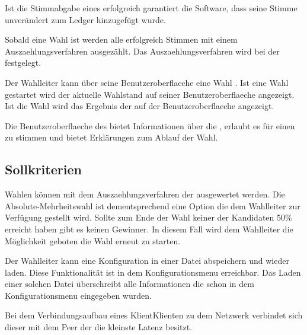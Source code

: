 \documentclass[parskip=full,11pt,twoside]{scrartcl}
\begin{document}
Ist die \gls{Stimmabgabe} eines  erfolgreich garantiert die Software, dass seine \gls{Stimme} unverändert zum \gls{Ledger} hinzugefügt wurde.

Sobald eine \gls{Wahl}  ist werden alle erfolgreich  Stimmen mit einem \gls{Auszaehlungsverfahren} ausgezählt. Das \gls{Auszaehlungsverfahren} wird bei der  festgelegt.

Der \gls{Wahlleiter} kann über seine \gls{Benutzeroberflaeche} eine Wahl . Ist eine \gls{Wahl} gestartet wird der aktuelle \gls{Wahlstand} auf seiner \gls{Benutzeroberflaeche} angezeigt. Ist die Wahl  wird das Ergebnis der  auf der \gls{Benutzeroberflaeche} angezeigt.

Die \gls{Benutzeroberflaeche} des  bietet Informationen über die , erlaubt es für einen  zu stimmen und bietet Erklärungen zum Ablauf der Wahl.

\subsection{Sollkriterien}

Wahlen können mit dem \gls{Auszaehlungsverfahren} der  ausgewertet werden. Die \gls{Absolute-Mehrheitswahl} ist dementsprechend eine Option die dem \gls{Wahlleiter} zur Verfügung gestellt wird.
Sollte zum Ende der Wahl keiner der Kandidaten 50\% erreicht haben gibt es keinen Gewinner.
In diesem Fall wird dem Wahlleiter die Möglichkeit geboten die Wahl erneut zu starten.

Der \gls{Wahlleiter} kann eine \gls{Konfiguration} in einer Datei abspeichern und wieder laden. Diese Funktionalität ist in dem \gls{Konfigurationsmenu} erreichbar. Das Laden einer solchen Datei überschreibt alle Informationen die schon in dem \gls{Konfigurationsmenu} eingegeben wurden.

Bei dem Verbindungsaufbau eines \gls{Klient}{Klienten} zu dem \gls{Netzwerk} verbindet sich dieser mit dem \gls{Peer} der die kleinste Latenz besitzt.
\end{document}
